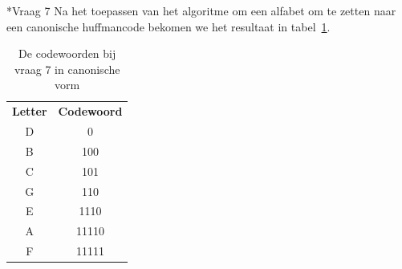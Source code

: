 \documentclass[]{article}
\begin{document}
\begin{section}
    \begin{subsection}*{Vraag 7}
		Na het toepassen van het algoritme om een alfabet om te zetten naar een
		canonische huffmancode bekomen we het resultaat in
		tabel~\ref{tab:canonical_codes}.
        \begin{table}
    		\centering	
    		\begin{tabular}{c|c}
    		\textbf{Letter} &
            \textbf{Codewoord} \\
    		D & 0 \\
			B & 100 \\
			C & 101 \\
			G & 110 \\
			E & 1110 \\
			A & 11110 \\
			F & 11111 \\
    		\end{tabular}
    		\caption{De codewoorden bij vraag 7 in canonische vorm}
    		\label{tab:canonical_codes}
    	\end{table}

   	\end{subsection}

\end{section}
\end{document}
